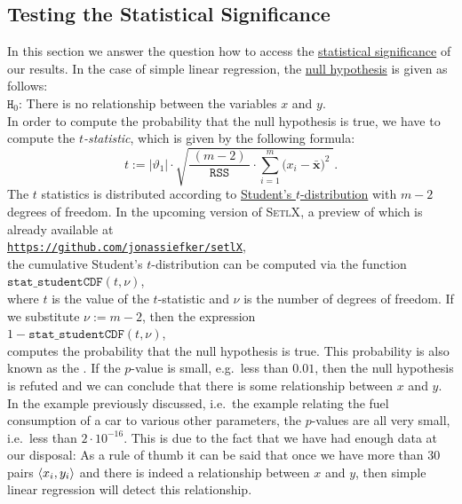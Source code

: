 \subsection{Testing the Statistical Significance}
In this section we answer the question how to access the 
\href{https://en.wikipedia.org/wiki/Statistical_significance}{statistical significance} of our
results.  In the case of simple linear regression, the
\href{https://en.wikipedia.org/wiki/Null_hypothesis}{null hypothesis} is given as follows: 
\\[0.2cm]
\hspace*{1.3cm}
$\mathtt{H}_0$: There is no relationship between the variables $x$ and $y$.
\\[0.2cm]
In order to compute the probability that the null hypothesis is true, we have to compute the
\emph{\color{blue} $t$-statistic}, which is given by the following formula:
\begin{equation}
  \label{eq:t-statistics}
  t := |\vartheta_1| \cdot \sqrt{\frac{\;(m-2)\;}{\mathtt{RSS}} \cdot \sum\limits_{i=1}^m \bigl(x_i - \bar{\mathbf{x}}\bigr)^2\; }.
\end{equation}
The $t$ statistics is distributed according to 
\href{https://en.wikipedia.org/wiki/Student%27s_t-distribution}{Student's $t$-distribution} 
with $m-2$ degrees of freedom.  In the upcoming version of \textsc{SetlX}, a preview of which is already available at
\\[0.2cm]
\hspace*{1.3cm}
\href{https://github.com/jonassiefker/setlX}{\texttt{https://github.com/jonassiefker/setlX}},
\\[0.2cm]
the cumulative Student's $t$-distribution can be computed
via the function
\\[0.2cm]
\hspace*{1.3cm}
$\mathtt{stat\_studentCDF}(t, \nu)$,
\\[0.2cm]
where $t$ is the value of the $t$-statistic and $\nu$ is the number of degrees of freedom.  If we substitute
$\nu := m - 2$, then the expression 
\\[0.2cm]
\hspace*{1.3cm}
$1 - \mathtt{stat\_studentCDF}(t, \nu)$,
\\[0.2cm]
 computes the probability that the null hypothesis is true.  This probability
is also known as the .  If the $p$-value is small, e.g.~less than $0.01$, then the null
hypothesis is refuted and we can conclude that there is some relationship between $x$ and $y$.  In the example
previously discussed, i.e.~the example relating the fuel consumption of a car to various other parameters, the
$p$-values are all very small, i.e.~less than $2 \cdot 10^{-16}$.  This is due to the fact that we have had enough data at
our disposal:  As a rule of thumb it can be said that once we have more than 30 pairs $\pair(x_i, y_i)$ and there
is indeed a relationship between $x$ and $y$, then simple linear regression will detect this relationship.


